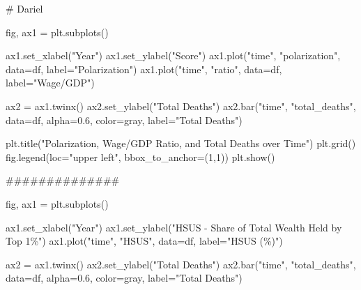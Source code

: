 \documentclass[
  letterpaper,
  DIV=11,
  numbers=noendperiod]{scrartcl}
\newenvironment{Shaded}{\begin{snugshade}}{\end{snugshade}}
\newcommand{\CommentTok}[1]{\textcolor[rgb]{0.37,0.37,0.37}{#1}}
\newcommand{\DecValTok}[1]{\textcolor[rgb]{0.68,0.00,0.00}{#1}}
\newcommand{\FloatTok}[1]{\textcolor[rgb]{0.68,0.00,0.00}{#1}}
\newcommand{\NormalTok}[1]{\textcolor[rgb]{0.00,0.23,0.31}{#1}}
\newcommand{\OperatorTok}[1]{\textcolor[rgb]{0.37,0.37,0.37}{#1}}
\newcommand{\StringTok}[1]{\textcolor[rgb]{0.13,0.47,0.30}{#1}}
\begin{document}
\begin{Shaded}
\begin{Highlighting}[]
\CommentTok{\# Dariel}

\NormalTok{fig, ax1 }\OperatorTok{=}\NormalTok{ plt.subplots()}

\NormalTok{ax1.set\_xlabel(}\StringTok{"Year"}\NormalTok{)}
\NormalTok{ax1.set\_ylabel(}\StringTok{"Score"}\NormalTok{)}
\NormalTok{ax1.plot(}\StringTok{"time"}\NormalTok{, }\StringTok{"polarization"}\NormalTok{, data}\OperatorTok{=}\NormalTok{df, label}\OperatorTok{=}\StringTok{"Polarization"}\NormalTok{)}
\NormalTok{ax1.plot(}\StringTok{"time"}\NormalTok{, }\StringTok{"ratio"}\NormalTok{, data}\OperatorTok{=}\NormalTok{df, label}\OperatorTok{=}\StringTok{"Wage/GDP"}\NormalTok{)}

\NormalTok{ax2 }\OperatorTok{=}\NormalTok{ ax1.twinx()}
\NormalTok{ax2.set\_ylabel(}\StringTok{"Total Deaths"}\NormalTok{)}
\NormalTok{ax2.bar(}\StringTok{"time"}\NormalTok{, }\StringTok{"total\_deaths"}\NormalTok{, data}\OperatorTok{=}\NormalTok{df, alpha}\OperatorTok{=}\FloatTok{0.6}\NormalTok{, color}\OperatorTok{=}\StringTok{\textquotesingle{}gray\textquotesingle{}}\NormalTok{, label}\OperatorTok{=}\StringTok{"Total Deaths"}\NormalTok{)}

\NormalTok{plt.title(}\StringTok{"Polarization, Wage/GDP Ratio, and Total Deaths over Time"}\NormalTok{)}
\NormalTok{plt.grid()}
\NormalTok{fig.legend(loc}\OperatorTok{=}\StringTok{"upper left"}\NormalTok{, bbox\_to\_anchor}\OperatorTok{=}\NormalTok{(}\DecValTok{1}\NormalTok{,}\DecValTok{1}\NormalTok{))}
\NormalTok{plt.show()}

\CommentTok{\#\#\#\#\#\#\#\#\#\#\#\#\#\#}

\NormalTok{fig, ax1 }\OperatorTok{=}\NormalTok{ plt.subplots()}

\NormalTok{ax1.set\_xlabel(}\StringTok{"Year"}\NormalTok{)}
\NormalTok{ax1.set\_ylabel(}\StringTok{"HSUS {-} Share of Total Wealth Held by Top 1\%"}\NormalTok{)}
\NormalTok{ax1.plot(}\StringTok{"time"}\NormalTok{, }\StringTok{"HSUS"}\NormalTok{, data}\OperatorTok{=}\NormalTok{df, label}\OperatorTok{=}\StringTok{"HSUS (\%)"}\NormalTok{)}

\NormalTok{ax2 }\OperatorTok{=}\NormalTok{ ax1.twinx()}
\NormalTok{ax2.set\_ylabel(}\StringTok{"Total Deaths"}\NormalTok{)}
\NormalTok{ax2.bar(}\StringTok{"time"}\NormalTok{, }\StringTok{"total\_deaths"}\NormalTok{, data}\OperatorTok{=}\NormalTok{df, alpha}\OperatorTok{=}\FloatTok{0.6}\NormalTok{, color}\OperatorTok{=}\StringTok{\textquotesingle{}gray\textquotesingle{}}\NormalTok{, label}\OperatorTok{=}\StringTok{"Total Deaths"}\NormalTok{)}


\end{Highlighting}
\end{Shaded}
\end{document}
